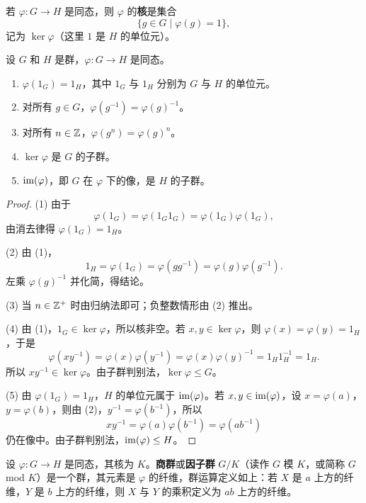 \begin{definition}
	 若 $\varphi:G\to H$ 是同态，则 $\varphi$ 的\textbf{核}是集合
	\[
	\{g\in G\mid \varphi(g)=1\},
	\]
	记为 $\ker\varphi$（这里 $1$ 是 $H$ 的单位元）。
\end{definition}
\begin{proposition}\label{核的群性质}
	设 $G$ 和 $H$ 是群，$\varphi:G\to H$ 是同态。
	\begin{enumerate}[label=(\arabic*)]
		\item $\varphi(1_G)=1_H$，其中 $1_G$ 与 $1_H$ 分别为 $G$ 与 $H$ 的单位元。
		\item 对所有 $g\in G$，$\varphi(g^{-1})=\varphi(g)^{-1}$。
		\item 对所有 $n\in\mathbb{Z}$，$\varphi(g^n)=\varphi(g)^n$。
		\item $\ker\varphi$ 是 $G$ 的子群。
		\item $\operatorname{im}(\varphi)$，即 $G$ 在 $\varphi$ 下的像，是 $H$ 的子群。
	\end{enumerate}
\end{proposition}
\begin{proof}
	(1) 由于
	\[
	\varphi(1_G)=\varphi(1_G1_G)=\varphi(1_G)\varphi(1_G),
	\]
	由消去律得 $\varphi(1_G)=1_H$。
	
	(2) 由 (1)，
	\[
	1_H=\varphi(1_G)=\varphi(gg^{-1})=\varphi(g)\varphi(g^{-1}).
	\]
	左乘 $\varphi(g)^{-1}$ 并化简，得结论。
	
	(3) 当 $n\in\mathbb{Z}^+$ 时由归纳法即可；负整数情形由 (2) 推出。
	
	(4) 由 (1)，$1_G\in\ker\varphi$，所以核非空。若 $x,y\in\ker\varphi$，则 $\varphi(x)=\varphi(y)=1_H$，于是
	\[
	\varphi(xy^{-1})=\varphi(x)\varphi(y^{-1})
	=\varphi(x)\varphi(y)^{-1}=1_H1_H^{-1}=1_H.
	\]
	所以 $xy^{-1}\in\ker\varphi$。由子群判别法，$\ker\varphi\leq G$。
	
	(5) 由 $\varphi(1_G)=1_H$，$H$ 的单位元属于 $\operatorname{im}(\varphi)$。若 $x,y\in\operatorname{im}(\varphi)$，设 $x=\varphi(a)$，$y=\varphi(b)$，则由 (2)，$y^{-1}=\varphi(b^{-1})$，所以
	\[
	xy^{-1}=\varphi(a)\varphi(b^{-1})=\varphi(ab^{-1})
	\]
	仍在像中。由子群判别法，$\operatorname{im}(\varphi)\leq H$。
\end{proof}

\begin{definition}
	设 $\varphi:G\to H$ 是同态，其核为 $K$。\textbf{商群}或\textbf{因子群} $G/K$（读作 $G$ 模 $K$，或简称 $G$ mod $K$）是一个群，其元素是 $\varphi$ 的纤维，群运算定义如上：若 $X$ 是 $a$ 上方的纤维，$Y$ 是 $b$ 上方的纤维，则 $X$ 与 $Y$ 的乘积定义为 $ab$ 上方的纤维。
\end{definition}

